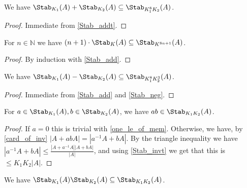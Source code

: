 \begin{lemma}
    \label{Stab_add}
    \leanok
    We have $\Stab_{K_1}(A) + \Stab_{K_2}(A) \subseteq \Stab_{K_1^8 K_2}(A)$.
\end{lemma}

\begin{proof}
    \leanok
    Immediate from \ref{Stab_addt}.
\end{proof}

\begin{lemma}
    \label{Stab_nsmul}
    \leanok
    For $n \in \mathbb{N}$ we have $(n+1) \cdot \Stab_{K}(A) \subseteq \Stab_{K^{8n + 1}}(A)$.
\end{lemma}

\begin{proof}
    \leanok
    By induction with \ref{Stab_add}.
\end{proof}

\begin{lemma}
    \label{Stab_sub}
    \leanok
    We have $\Stab_{K_1}(A) - \Stab_{K_2}(A) \subseteq \Stab_{K_1^8 K_2^3}(A)$.
\end{lemma}

\begin{proof}
    \leanok
    Immediate from \ref{Stab_add} and \ref{Stab_neg}.
\end{proof}

\begin{lemma}
    \label{Stab_mult}
    \leanok
    For $a \in \Stab_{K_1}(A), b \in \Stab_{K_2}(A)$, we have $ab \in \Stab_{K_1 K_2}(A)$.
\end{lemma}

\begin{proof}
    \leanok
    If $a = 0$ this is trivial with \ref{one_le_of_mem}. Otherwise, we have, by \ref{card_of_inv}
    $|A + a b A| = |a^{-1} A + b A|$. By the triangle inequality we have
    $|a^{-1} A + b A| \leq \frac{|A + a^{-1} A| |A + b A|}{|A|}$, and using \ref{Stab_invt} we get that this is
    $\leq K_1 K_2 |A|$.
\end{proof}

\begin{lemma}
    \label{Stab_mul}
    \leanok
    We have $\Stab_{K_1}(A) \Stab_{K_2}(A) \subseteq \Stab_{K_1 K_2}(A)$.
\end{lemma}

